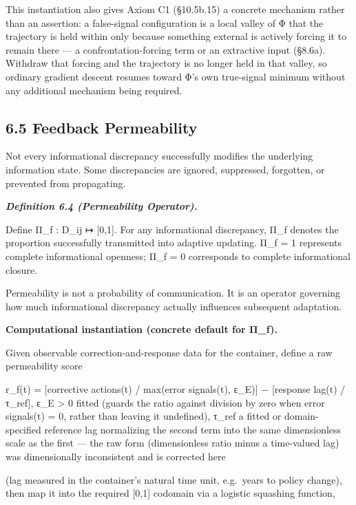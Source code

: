 \documentclass[
]{article}
\begin{document}
This instantiation also gives Axiom C1 (§10.5b.15) a concrete mechanism
rather than an assertion: a false-signal configuration is a local valley
of Φ that the trajectory is held within only because something external
is actively forcing it to remain there --- a confrontation-forcing term
or an extractive input (§8.6a). Withdraw that forcing and the trajectory
is no longer held in that valley, so ordinary gradient descent resumes
toward Φ's own true-signal minimum without any additional mechanism
being required.

\hypertarget{feedback-permeability}{%
\subsection{6.5 Feedback Permeability}\label{feedback-permeability}}

Not every informational discrepancy successfully modifies the underlying
information state. Some discrepancies are ignored, suppressed,
forgotten, or prevented from propagating.

\emph{\textbf{Definition 6.4 (Permeability Operator).}}

Define Π\_f : D\_ij ↦ {[}0,1{]}. For any informational discrepancy, Π\_f
denotes the proportion successfully transmitted into adaptive updating.
Π\_f = 1 represents complete informational openness; Π\_f = 0
corresponds to complete informational closure.

Permeability is not a probability of communication. It is an operator
governing how much informational discrepancy actually influences
subsequent adaptation.

\textbf{Computational instantiation (concrete default for Π\_f).}

Given observable correction-and-response data for the container, define
a raw permeability score

r\_f(t) = {[}corrective actions(t) / max(error signals(t), ε\_E){]} −
{[}response lag(t) / τ\_ref{]}, ε\_E \textgreater{} 0 fitted (guards the
ratio against division by zero when error signals(t) = 0, rather than
leaving it undefined), τ\_ref a fitted or domain-specified reference lag
normalizing the second term into the same dimensionless scale as the
first --- the raw form (dimensionless ratio minus a time-valued lag) was
dimensionally inconsistent and is corrected here

(lag measured in the container's natural time unit, e.g.~years to policy
change), then map it into the required {[}0,1{]} codomain via a logistic
squashing function,
\end{document}
